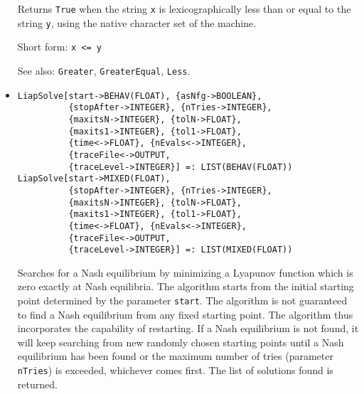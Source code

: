 \begin{itemize}
\bd
Returns \verb+True+ when the string \verb+x+ is lexicographically less than
or equal to the string \verb+y+, using the native character set of the machine.
\item [Short form:] \verb+x <= y+
\item [See also:] \verb+Greater+, \verb+GreaterEqual+, \verb+Less+.
\ed

\item{}
\protect \large \begin{verbatim}
LiapSolve[start->BEHAV(FLOAT), {asNfg->BOOLEAN},
          {stopAfter->INTEGER}, {nTries->INTEGER},
          {maxitsN->INTEGER}, {tolN->FLOAT},
          {maxits1->INTEGER}, {tol1->FLOAT},
          {time<->FLOAT}, {nEvals<->INTEGER},
          {traceFile<->OUTPUT,
          {traceLevel->INTEGER}] =: LIST(BEHAV(FLOAT))
LiapSolve[start->MIXED(FLOAT), 
          {stopAfter->INTEGER}, {nTries->INTEGER},
          {maxitsN->INTEGER}, {tolN->FLOAT},
          {maxits1->INTEGER}, {tol1->FLOAT},
          {time<->FLOAT}, {nEvals<->INTEGER},
          {traceFile<->OUTPUT, 
          {traceLevel->INTEGER}] =: LIST(MIXED(FLOAT))
\end{verbatim}\normalsize


\bd 
Searches for a Nash equilibrium by minimizing a Lyapunov function
which is zero exactly at Nash equilibria.  The algorithm starts from
the initial starting point determined by the parameter \verb+start+.
The algorithm is not guaranteed to find a Nash equilibrium from any
fixed starting point.  The algorithm thus incorporates the capability
of restarting.  If a Nash equilibrium is not found, it will keep
searching from new randomly chosen starting points until a Nash
equilibrium has been found or the maximum number of tries (parameter
\verb+nTries+) is exceeded, whichever comes first.  The list of
solutions found is returned.


\end{itemize}
